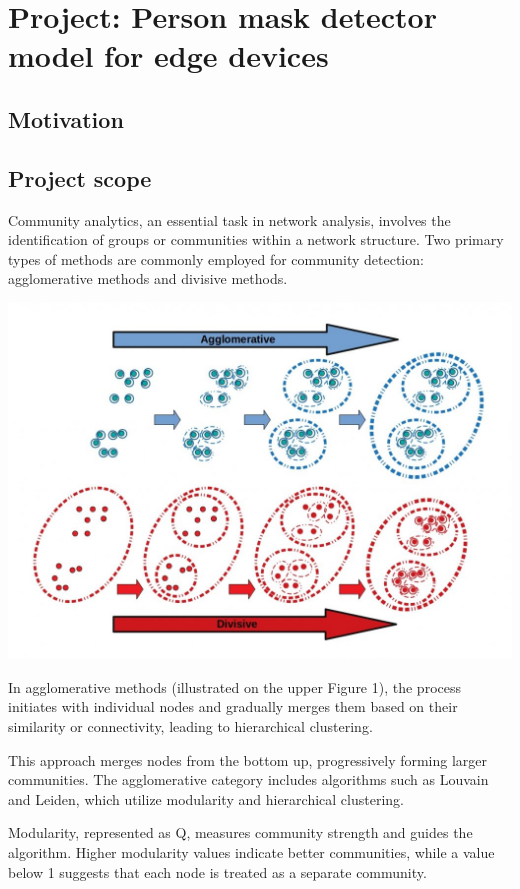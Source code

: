 \section{Project: Person mask detector model for edge devices}
\subsection{Motivation}

\subsection{Project scope}
Community analytics, an essential task in network analysis, involves the identification of groups or communities within a network structure. Two primary types of methods are commonly employed for community detection: agglomerative methods and divisive methods.
\begin{center}
    \includegraphics[scale=0.45]{image/agglo_divi_algo.jpeg}
\end{center}
In agglomerative methods (illustrated on the upper Figure 1), the process initiates with individual nodes and gradually merges them based on their similarity or connectivity, leading to hierarchical clustering. 

This approach merges nodes from the bottom up, progressively forming larger communities. The agglomerative category includes algorithms such as Louvain and Leiden, which utilize modularity and hierarchical clustering. 

Modularity, represented as Q, measures community strength and guides the algorithm. Higher modularity values indicate better communities, while a value below 1 suggests that each node is treated as a separate community. 

